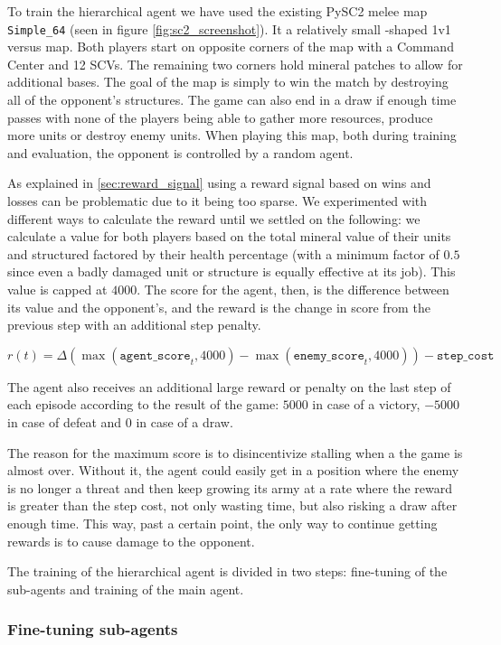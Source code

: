 To train the hierarchical agent we have used the existing PySC2 melee map \texttt{Simple\_64} (seen in figure \ref{fig:sc2_screenshot}). It a relatively small -shaped 1v1 versus map. Both players start on opposite corners of the map with a Command Center and 12 SCVs. The remaining two corners hold mineral patches to allow for additional bases. The goal of the map is simply to win the match by destroying all of the opponent's structures. The game can also end in a draw if enough time passes with none of the players being able to gather more resources, produce more units or destroy enemy units. When playing this map, both during training and evaluation, the opponent is controlled by a random agent.

As explained in \ref{sec:reward_signal} using a reward signal based on wins and losses can be problematic due to it being too sparse. We experimented with different ways to calculate the reward until we settled on the following: we calculate a value for both players based on the total mineral value of their units and structured factored by their health percentage (with a minimum factor of $0.5$ since even a badly damaged unit or structure is equally effective at its job). This value is capped at $4000$. The score for the agent, then, is the difference between its value and the opponent's, and the reward is the change in score from the previous step with an additional step penalty.

$$
r(t) = \Delta(\max(\texttt{agent\_score}_{t}, 4000) - \max(\texttt{enemy\_score}_{t}, 4000)) - \texttt{step\_cost}
$$

The agent also receives an additional large reward or penalty on the last step of each episode according to the result of the game: $5000$ in case of a victory, $-5000$ in case of defeat and $0$ in case of a draw.

The reason for the maximum score is to disincentivize stalling when a the game is almost over. Without it, the agent could easily get in a position where the enemy is no longer a threat and then keep growing its army at a rate where the reward is greater than the step cost, not only wasting time, but also risking a draw after enough time. This way, past a certain point, the only way to continue getting rewards is to cause damage to the opponent.

The training of the hierarchical agent is divided in two steps: fine-tuning of the sub-agents and training of the main agent.

\subsubsection*{Fine-tuning sub-agents}


